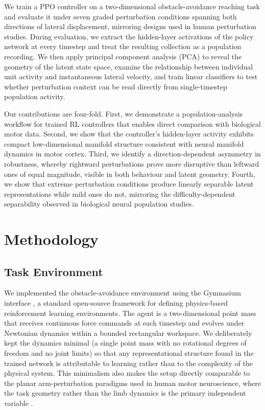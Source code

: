 \documentclass{article}
\begin{document}
We train a PPO controller on a two-dimensional obstacle-avoidance reaching
task and evaluate it under seven graded perturbation conditions spanning
both directions of lateral displacement, mirroring designs used in human
perturbation studies.
During evaluation, we extract the hidden-layer activations of the policy
network at every timestep and treat the resulting collection as a
population recording.
We then apply principal component analysis (PCA) to reveal the geometry
of the latent state space, examine the relationship between individual
unit activity and instantaneous lateral velocity, and train linear
classifiers to test whether perturbation context can be read directly
from single-timestep population activity.

Our contributions are four-fold.
First, we demonstrate a population-analysis workflow for trained RL
controllers that enables direct comparison with biological motor data.
Second, we show that the controller's hidden-layer activity exhibits
compact low-dimensional manifold structure consistent with neural manifold
dynamics in motor cortex.
Third, we identify a direction-dependent asymmetry in robustness, whereby
rightward perturbations prove more disruptive than leftward ones of equal
magnitude, visible in both behaviour and latent geometry.
Fourth, we show that extreme perturbation conditions produce linearly
separable latent representations while mild ones do not, mirroring the
difficulty-dependent separability observed in biological neural population
studies.


\section{Methodology}

\subsection{Task Environment}

We implemented the obstacle-avoidance environment using the Gymnasium
interface \citep{Towers2024Gymnasium}, a standard open-source framework
for defining physics-based reinforcement learning environments.
The agent is a two-dimensional point mass that receives continuous force
commands at each timestep and evolves under Newtonian dynamics within a
bounded rectangular workspace.
We deliberately kept the dynamics minimal (a single point mass with no
rotational degrees of freedom and no joint limits) so that any
representational structure found in the trained network is attributable
to learning rather than to the complexity of the physical system.
This minimalism also makes the setup directly comparable to the planar
arm-perturbation paradigms used in human motor neuroscience, where the
task geometry rather than the limb dynamics is the primary independent
variable \citep{Nashed2014,Pruszynski2012,Shadmehr1994,Franklin2011}.
\end{document}
